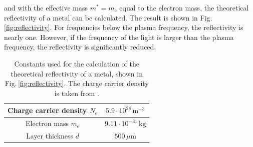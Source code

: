 and with the effective mass $m^* = m_\text{e}$ equal to the electron mass, 
the theoretical reflectivity of a metal can be calculated. 
The result is shown in Fig.\,\ref{fig:reflectivity}.
For frequencies below the plasma frequency, the reflectivity is nearly one. 
However, if the frequency of the light is larger than the plasma frequency, the reflectivity is significantly reduced.
\begin{table}[h]
    \centering
    \begin{tabular}{c|c}
        \hline\hline
        Charge carrier density $N_\text{e}$ & $5.9\cdot10^{28}\,\text{m}^{-3}$ \\ \hline
        Electron mass $m_\text{e}$ & $9.11\cdot10^{-31}\,\text{kg}$ \\ \hline
        Layer thickness $d$ & $500\,\mu\text{m}$ \\ \hline\hline
    \end{tabular}
    \caption{Constants used for the calculation of the theoretical reflectivity of a metal, 
    shown in Fig.\,\ref{fig:reflectivity}. The charge carrier density is taken from \cite{Mathematica}.}
    \label{tab:metalConstants}
\end{table}

